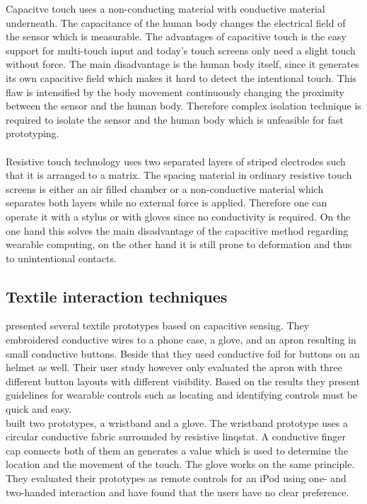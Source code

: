 Capacitve touch uses a non-conducting material with conductive material underneath. The capacitance of the human body changes the electrical field of the sensor which is measurable. The advantages of capacitive touch is the easy support for multi-touch input and today's touch screens only need a slight touch without force. The main disadvantage is the human body itself, since  it generates its own capacitive field which makes it hard to detect the intentional touch. This flaw is intensified by the body movement continuously changing the proximity between the sensor and the human body. Therefore complex isolation technique is required to isolate the sensor and the human body which is unfeasible for fast prototyping. \\ \\
Resistive touch technology uses two separated layers of striped electrodes such that it is arranged to a matrix. The spacing material in ordinary resistive touch screens is either an air filled chamber or a non-conductive material which separates both layers while no external force is applied. Therefore one can operate it with a stylus or with gloves since no conductivity is required. On the one hand this solves the main disadvantage of the capacitive method regarding wearable computing, on the other hand it is still prone to deformation and thus to unintentional contacts.

\subsection{Textile interaction techniques}
\cite{Holleis:2008:ECT:1409240.1409250} presented several textile prototypes based on capacitive sensing. They embroidered conductive wires to  a phone case, a glove, and an apron resulting in small conductive buttons. Beside that they used conductive foil for buttons on an helmet as well. Their user study however only evaluated the apron with three different button layouts with different visibility. Based on the results they present guidelines for wearable controls such as locating and identifying controls must be quick and easy.
\\
\cite{Speir:2014:WRC:2628363.2634221} built two prototypes, a wristband and a glove. The wristband prototype uses a circular conductive fabric surrounded by resistive linqstat. A conductive finger cap connects both of them an generates a value which is used to determine the location and the movement of the touch. The glove works on the same principle. They evaluated their prototypes as remote controls for an iPod using one- and two-handed interaction and have found that the users have no clear preference. 

